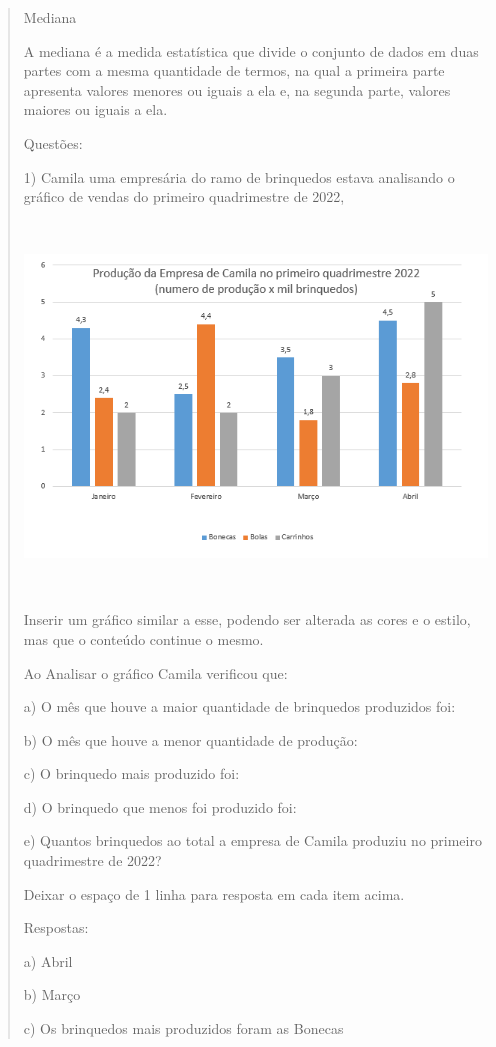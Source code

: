 \begin{quote}
\begin{escolha}
Mediana

A mediana é a medida estatística que divide o conjunto de dados em duas
partes com a mesma quantidade de termos, na qual a primeira parte
apresenta valores menores ou iguais a ela e, na segunda parte, valores
maiores ou iguais a ela.

Questões:

1) Camila uma empresária do ramo de brinquedos estava analisando o
gráfico de vendas do primeiro quadrimestre de 2022,

\includegraphics[width=5.90625in,height=3.86458in]{./imgSAEB_8_MAT/media/image39.png}

Inserir um gráfico similar a esse, podendo ser alterada as cores e o
estilo, mas que o conteúdo continue o mesmo.

Ao Analisar o gráfico Camila verificou que:

a) O mês que houve a maior quantidade de brinquedos produzidos foi:

b) O mês que houve a menor quantidade de produção:

c) O brinquedo mais produzido foi:

d) O brinquedo que menos foi produzido foi:

e) Quantos brinquedos ao total a empresa de Camila produziu no primeiro
quadrimestre de 2022?

Deixar o espaço de 1 linha para resposta em cada item acima.

Respostas:

a) Abril

b) Março

c) Os brinquedos mais produzidos foram as Bonecas


\end{escolha}
\end{quote}
